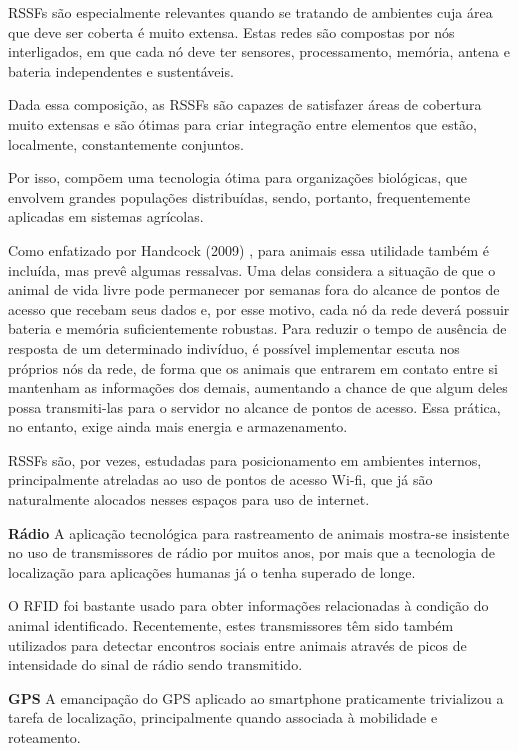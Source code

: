 RSSFs são especialmente relevantes quando se tratando de ambientes cuja área que deve ser coberta é muito extensa. Estas redes são compostas por nós interligados, em que cada nó deve ter sensores, processamento, memória, antena e bateria independentes e sustentáveis.

Dada essa composição, as RSSFs são capazes de satisfazer áreas de cobertura muito extensas e são ótimas para criar integração entre elementos que estão, localmente, constantemente conjuntos.

Por isso, compõem uma tecnologia ótima para organizações biológicas, que envolvem grandes populações distribuídas, sendo, portanto, frequentemente aplicadas em sistemas agrícolas.

Como enfatizado por Handcock (2009) \cite{handcock}, para animais essa utilidade também é incluída, mas prevê algumas ressalvas. Uma delas considera a situação de que o animal de vida livre pode permanecer por semanas fora do alcance de pontos de acesso que recebam seus dados e, por esse motivo, cada nó da rede deverá possuir bateria e memória suficientemente robustas. Para reduzir o tempo de ausência de resposta de um determinado indivíduo, é possível implementar escuta nos próprios nós da rede, de forma que os animais que entrarem em contato entre si mantenham as informações dos demais, aumentando a chance de que algum deles possa transmiti-las para o servidor no alcance de pontos de acesso. Essa prática, no entanto, exige ainda mais energia e armazenamento.

RSSFs são, por vezes, estudadas para posicionamento em ambientes internos, principalmente atreladas ao uso de pontos de acesso Wi-fi, que já são naturalmente alocados nesses espaços para uso de internet.

\textbf{Rádio}
A aplicação tecnológica para rastreamento de animais mostra-se insistente no uso de transmissores de rádio por muitos anos, por mais que a tecnologia de localização para aplicações humanas já o tenha superado de longe.

O RFID foi bastante usado para obter informações relacionadas à condição do animal identificado. Recentemente, estes transmissores têm sido também utilizados para detectar encontros sociais entre animais através de picos de intensidade do sinal de rádio sendo transmitido.

\textbf{GPS}
A emancipação do GPS aplicado ao smartphone praticamente trivializou a tarefa de localização, principalmente quando associada à mobilidade e roteamento.

